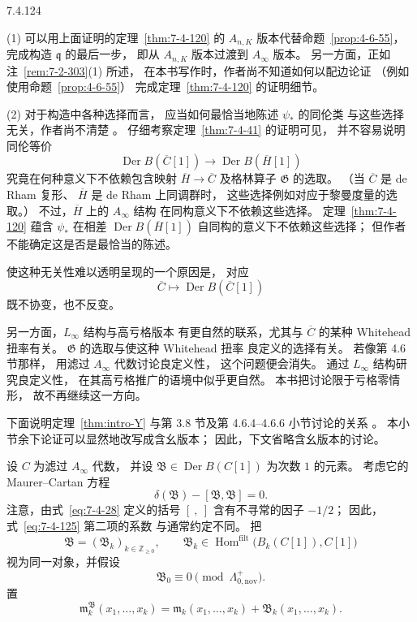 \begin{remark}{7.4.124}\label{rem:7-4-124}
\par\noindent\textup{(1)}
可以用上面证明的定理~\ref{thm:7-4-120}
的 $A_{n,K}$ 版本代替命题~\ref{prop:4-6-55}，
完成构造 $\mathfrak q$ 的最后一步，
即从 $A_{n,K}$ 版本过渡到 $A_\infty$ 版本。
另一方面，正如注~\ref{rem:7-2-303}(1) 所述，
在本书写作时，作者尚不知道如何以配边论证
（例如使用命题~\ref{prop:4-6-55}）
完成定理~\ref{thm:7-4-120} 的证明细节。

\par\noindent\textup{(2)}
对于构造中各种选择而言，
应当如何最恰当地陈述 $\psi_*$ 的同伦类
与这些选择无关，作者尚不清楚
。
仔细考察定理~\ref{thm:7-4-41} 的证明可见，
并不容易说明同伦等价
\[
\operatorname{Der}B(\overline C[1])
\longrightarrow
\operatorname{Der}B(\overline H[1])
\]
究竟在何种意义下不依赖包含映射
$\overline H\to\overline C$
及格林算子 $\mathfrak G$ 的选取。
（当 $\overline C$ 是 de Rham 复形、
$\overline H$ 是 de Rham 上同调群时，
这些选择例如对应于黎曼度量的选取。）
不过，$\overline H$ 上的 $A_\infty$ 结构
在同构意义下不依赖这些选择。
定理~\ref{thm:7-4-120} 蕴含
$\psi_*$ 在相差
$\operatorname{Der}B(\overline H[1])$
自同构的意义下不依赖这些选择；
但作者不能确定这是否是最恰当的陈述。

使这种无关性难以透明呈现的一个原因是，
对应
\[
\overline C\longmapsto
\operatorname{Der}B(\overline C[1])
\]
既不协变，也不反变。

另一方面，$L_\infty$ 结构与高亏格版本
有更自然的联系，尤其与 $\overline C$ 的某种
Whitehead 扭率有关。
$\mathfrak G$ 的选取与使这种 Whitehead 扭率
良定义的选择有关。
若像第 4.6 节那样，
用滤过 $A_\infty$ 代数讨论良定义性，
这个问题便会消失。
通过 $L_\infty$ 结构研究良定义性，
在其高亏格推广的语境中似乎更自然。
本书把讨论限于亏格零情形，
故不再继续这一方向。
\end{remark}

下面说明定理~\ref{thm:intro-Y}
与第 3.8 节及第 4.6.4--4.6.6 小节讨论的关系
。
本小节余下论证可以显然地改写成含幺版本；
因此，下文省略含幺版本的讨论。

设 $C$ 为滤过 $A_\infty$ 代数，
并设
$\mathfrak B\in\operatorname{Der}B(C[1])$
为次数 $1$ 的元素。
考虑它的 Maurer--Cartan 方程
\begin{equation}
\delta(\mathfrak B)-[\mathfrak B,\mathfrak B]=0.
\tag{7.4.125}\label{eq:7-4-125}
\end{equation}
注意，由式~\eqref{eq:7-4-28} 定义的括号
$[\ ,\ ]$ 含有不寻常的因子 $-1/2$；
因此，式~\eqref{eq:7-4-125} 第二项的系数
与通常约定不同。
把
\[
\mathfrak B=(\mathfrak B_k)_{k\in\mathbb Z_{\ge0}},
\qquad
\mathfrak B_k\in
\operatorname{Hom}^{\mathrm{filt}}
\bigl(B_k(C[1]),C[1]\bigr)
\]
视为同一对象，并假设
\[
\mathfrak B_0\equiv0
\pmod{\Lambda^+_{0,\mathrm{nov}}}.
\]
置
\begin{equation}
\mathfrak m_k^{\mathfrak B}(x_1,\ldots,x_k)
=\mathfrak m_k(x_1,\ldots,x_k)
+\mathfrak B_k(x_1,\ldots,x_k).
\tag{7.4.126}\label{eq:7-4-126}
\end{equation}

